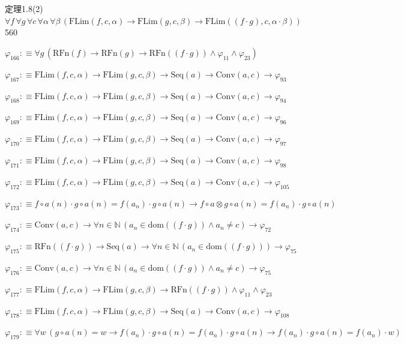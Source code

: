 \begin{fullproof}{定理1.8(2)}{$\forall f\,\forall g\,\forall c\,\forall \alpha\,\forall \beta\,(\mathrm{FLim}(f,c,\alpha) \to \mathrm{FLim}(g,c,\beta) \to \mathrm{FLim}((f \cdot g),c,\alpha \cdot \beta))$}{560}
\begin{abbrevlist}
\item $\varphi_{166} :\equiv \forall g\,(\mathrm{RFn}(f) \to \mathrm{RFn}(g) \to \mathrm{RFn}((f \cdot g)) \land \varphi_{11} \land \varphi_{23})$
\item $\varphi_{167} :\equiv \mathrm{FLim}(f,c,\alpha) \to \mathrm{FLim}(g,c,\beta) \to \mathrm{Seq}(a) \to \mathrm{Conv}(a,c) \to \varphi_{93}$
\item $\varphi_{168} :\equiv \mathrm{FLim}(f,c,\alpha) \to \mathrm{FLim}(g,c,\beta) \to \mathrm{Seq}(a) \to \mathrm{Conv}(a,c) \to \varphi_{94}$
\item $\varphi_{169} :\equiv \mathrm{FLim}(f,c,\alpha) \to \mathrm{FLim}(g,c,\beta) \to \mathrm{Seq}(a) \to \mathrm{Conv}(a,c) \to \varphi_{96}$
\item $\varphi_{170} :\equiv \mathrm{FLim}(f,c,\alpha) \to \mathrm{FLim}(g,c,\beta) \to \mathrm{Seq}(a) \to \mathrm{Conv}(a,c) \to \varphi_{97}$
\item $\varphi_{171} :\equiv \mathrm{FLim}(f,c,\alpha) \to \mathrm{FLim}(g,c,\beta) \to \mathrm{Seq}(a) \to \mathrm{Conv}(a,c) \to \varphi_{98}$
\item $\varphi_{172} :\equiv \mathrm{FLim}(f,c,\alpha) \to \mathrm{FLim}(g,c,\beta) \to \mathrm{Seq}(a) \to \mathrm{Conv}(a,c) \to \varphi_{105}$
\item $\varphi_{173} :\equiv f \circ a(n) \cdot g \circ a(n) = f(a_{n}) \cdot g \circ a(n) \to f \circ a \otimes g \circ a(n) = f(a_{n}) \cdot g \circ a(n)$
\item $\varphi_{174} :\equiv \mathrm{Conv}(a,c) \to \forall n \in \mathbb{N}\,(a_{n} \in \mathrm{dom}((f \cdot g)) \land a_{n} \neq c) \to \varphi_{72}$
\item $\varphi_{175} :\equiv \mathrm{RFn}((f \cdot g)) \to \mathrm{Seq}(a) \to \forall n \in \mathbb{N}\,(a_{n} \in \mathrm{dom}((f \cdot g))) \to \varphi_{75}$
\item $\varphi_{176} :\equiv \mathrm{Conv}(a,c) \to \forall n \in \mathbb{N}\,(a_{n} \in \mathrm{dom}((f \cdot g)) \land a_{n} \neq c) \to \varphi_{75}$
\item $\varphi_{177} :\equiv \mathrm{FLim}(f,c,\alpha) \to \mathrm{FLim}(g,c,\beta) \to \mathrm{RFn}((f \cdot g)) \land \varphi_{11} \land \varphi_{23}$
\item $\varphi_{178} :\equiv \mathrm{FLim}(f,c,\alpha) \to \mathrm{FLim}(g,c,\beta) \to \mathrm{Seq}(a) \to \mathrm{Conv}(a,c) \to \varphi_{108}$
\item $\varphi_{179} :\equiv \forall w\,(g \circ a(n) = w \to f(a_{n}) \cdot g \circ a(n) = f(a_{n}) \cdot g \circ a(n) \to f(a_{n}) \cdot g \circ a(n) = f(a_{n}) \cdot w)$

\end{abbrevlist}
\end{fullproof}
